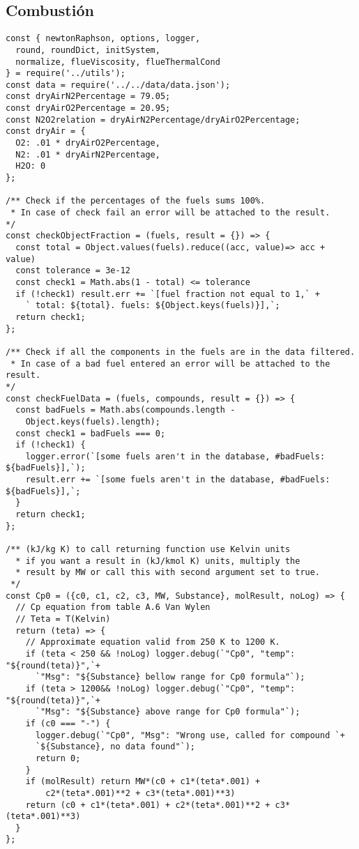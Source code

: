 \subsection{Combustión}
\begin{verbatim}
const { newtonRaphson, options, logger,
  round, roundDict, initSystem,
  normalize, flueViscosity, flueThermalCond
} = require('../utils');
const data = require('../../data/data.json');
const dryAirN2Percentage = 79.05;
const dryAirO2Percentage = 20.95;
const N2O2relation = dryAirN2Percentage/dryAirO2Percentage;
const dryAir = {
  O2: .01 * dryAirO2Percentage,
  N2: .01 * dryAirN2Percentage,
  H2O: 0
};

/** Check if the percentages of the fuels sums 100%.
 * In case of check fail an error will be attached to the result.
*/
const checkObjectFraction = (fuels, result = {}) => {
  const total = Object.values(fuels).reduce((acc, value)=> acc + value)
  const tolerance = 3e-12
  const check1 = Math.abs(1 - total) <= tolerance
  if (!check1) result.err += `[fuel fraction not equal to 1,` + 
    ` total: ${total}. fuels: ${Object.keys(fuels)}],`;
  return check1;
};

/** Check if all the components in the fuels are in the data filtered.
 * In case of a bad fuel entered an error will be attached to the result.
*/
const checkFuelData = (fuels, compounds, result = {}) => {
  const badFuels = Math.abs(compounds.length - 
    Object.keys(fuels).length);
  const check1 = badFuels === 0;
  if (!check1) {
    logger.error(`[some fuels aren't in the database, #badFuels: ${badFuels}],`);
    result.err += `[some fuels aren't in the database, #badFuels: ${badFuels}],`;
  }
  return check1;
};

/** (kJ/kg K) to call returning function use Kelvin units 
  * if you want a result in (kJ/kmol K) units, multiply the
  * result by MW or call this with second argument set to true.
 */
const Cp0 = ({c0, c1, c2, c3, MW, Substance}, molResult, noLog) => {
  // Cp equation from table A.6 Van Wylen
  // Teta = T(Kelvin)
  return (teta) => {
    // Approximate equation valid from 250 K to 1200 K.
    if (teta < 250 && !noLog) logger.debug(`"Cp0", "temp": "${round(teta)}",`+
      `"Msg": "${Substance} bellow range for Cp0 formula"`);
    if (teta > 1200&& !noLog) logger.debug(`"Cp0", "temp": "${round(teta)}",`+
      `"Msg": "${Substance} above range for Cp0 formula"`);
    if (c0 === "-") {
      logger.debug(`"Cp0", "Msg": "Wrong use, called for compound `+
      `${Substance}, no data found"`);
      return 0;
    }
    if (molResult) return MW*(c0 + c1*(teta*.001) + 
        c2*(teta*.001)**2 + c3*(teta*.001)**3)
    return (c0 + c1*(teta*.001) + c2*(teta*.001)**2 + c3*(teta*.001)**3)
  }
};


\end{verbatim}
